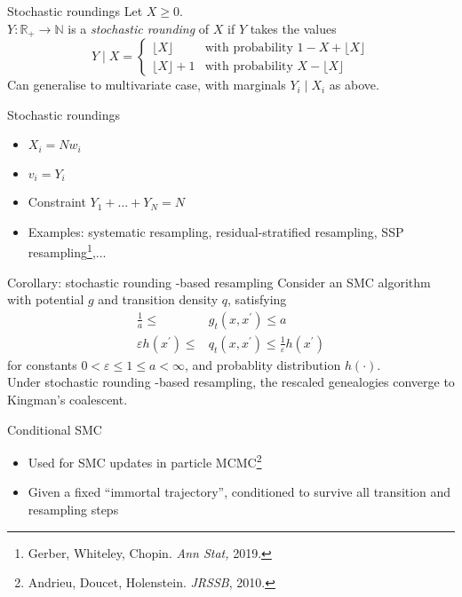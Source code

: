 \documentclass[aspectratio=169]{beamer}
\theoremstyle{definition}
\newcommand{\vt}[1]{v_{#1}}
\newcommand{\wt}[1]{w_{#1}}
\begin{document}
\begin{frame}{Stochastic roundings}
Let $X\geq 0$.\\
$Y: \mathbb{R}_+ \to \mathbb{N}$ is a \emph{stochastic rounding} of $X$ if $Y$ takes the values
\begin{equation*}
Y \mid X =
\begin{cases}
 \lfloor X \rfloor & \text{with probability } 1- X+ \lfloor X \rfloor \\
  \lfloor X \rfloor +1 & \text{with probability } X- \lfloor X \rfloor 
\end{cases}
\end{equation*}
\pause
Can generalise to multivariate case, with marginals $Y_i \mid X_i$ as above.
\end{frame}

\begin{frame}{Stochastic roundings}
\begin{itemize}
\item $X_i = N\wt{i}$
\item $\vt{i} = Y_i$
\item Constraint $Y_1+\dots +Y_N = N$
\pause
\item Examples: systematic resampling, residual-stratified resampling, SSP resampling\footnote{Gerber, Whiteley, Chopin. \textit{Ann Stat,} 2019.},...
\end{itemize}
\end{frame}

\begin{frame}{Corollary: stochastic rounding -based resampling}
Consider an SMC algorithm with potential $g$ and transition density $q$, satisfying
\begin{align}
\frac{1}{a} \leq &g_t(x, x^\prime) \leq a \\
\varepsilon h(x^\prime) \leq &q_t(x, x^\prime) \leq \frac{1}{\varepsilon} h(x^\prime) 
\end{align}
for constants $0<\varepsilon\leq 1\leq a<\infty$, and probablity distribution $h(\cdot)$.\\[10pt]

Under stochastic rounding -based resampling, the rescaled genealogies converge to Kingman's coalescent.
\end{frame}

\begin{frame}{Conditional SMC}
\begin{itemize}
\item Used for SMC updates in particle MCMC\footnote{Andrieu, Doucet, Holenstein. \textit{JRSSB}, 2010.}
\item Given a fixed ``immortal trajectory'', conditioned to survive all transition and resampling steps
\end{itemize}
\end{frame}
\end{document}
